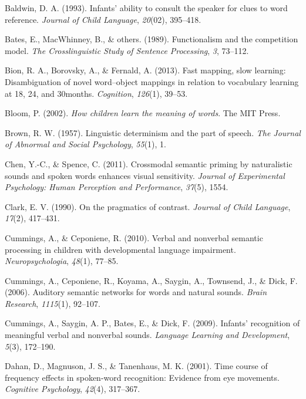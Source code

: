 \documentclass[english,floatsintext,man]{apa6}
\theoremstyle{definition}
\theoremstyle{definition}
\theoremstyle{definition}
\theoremstyle{remark}
\begin{document}
\hypertarget{ref-baldwin1993infants}{}
Baldwin, D. A. (1993). Infants' ability to consult the speaker for clues
to word reference. \emph{Journal of Child Language}, \emph{20}(02),
395--418.

\hypertarget{ref-bates1989functionalism}{}
Bates, E., MacWhinney, B., \& others. (1989). Functionalism and the
competition model. \emph{The Crosslinguistic Study of Sentence
Processing}, \emph{3}, 73--112.

\hypertarget{ref-bion2013fast}{}
Bion, R. A., Borovsky, A., \& Fernald, A. (2013). Fast mapping, slow
learning: Disambiguation of novel word--object mappings in relation to
vocabulary learning at 18, 24, and 30months. \emph{Cognition},
\emph{126}(1), 39--53.

\hypertarget{ref-bloom2002children}{}
Bloom, P. (2002). \emph{How children learn the meaning of words}. The
MIT Press.

\hypertarget{ref-brown1957linguistic}{}
Brown, R. W. (1957). Linguistic determinism and the part of speech.
\emph{The Journal of Abnormal and Social Psychology}, \emph{55}(1), 1.

\hypertarget{ref-chen2011crossmodal}{}
Chen, Y.-C., \& Spence, C. (2011). Crossmodal semantic priming by
naturalistic sounds and spoken words enhances visual sensitivity.
\emph{Journal of Experimental Psychology: Human Perception and
Performance}, \emph{37}(5), 1554.

\hypertarget{ref-clark1990pragmatics}{}
Clark, E. V. (1990). On the pragmatics of contrast. \emph{Journal of
Child Language}, \emph{17}(2), 417--431.

\hypertarget{ref-cummings2010verbal}{}
Cummings, A., \& Ceponiene, R. (2010). Verbal and nonverbal semantic
processing in children with developmental language impairment.
\emph{Neuropsychologia}, \emph{48}(1), 77--85.

\hypertarget{ref-cummings2006auditory}{}
Cummings, A., Ceponiene, R., Koyama, A., Saygin, A., Townsend, J., \&
Dick, F. (2006). Auditory semantic networks for words and natural
sounds. \emph{Brain Research}, \emph{1115}(1), 92--107.

\hypertarget{ref-cummings2009infants}{}
Cummings, A., Saygin, A. P., Bates, E., \& Dick, F. (2009). Infants'
recognition of meaningful verbal and nonverbal sounds. \emph{Language
Learning and Development}, \emph{5}(3), 172--190.

\hypertarget{ref-dahan2001time}{}
Dahan, D., Magnuson, J. S., \& Tanenhaus, M. K. (2001). Time course of
frequency effects in spoken-word recognition: Evidence from eye
movements. \emph{Cognitive Psychology}, \emph{42}(4), 317--367.
\end{document}
